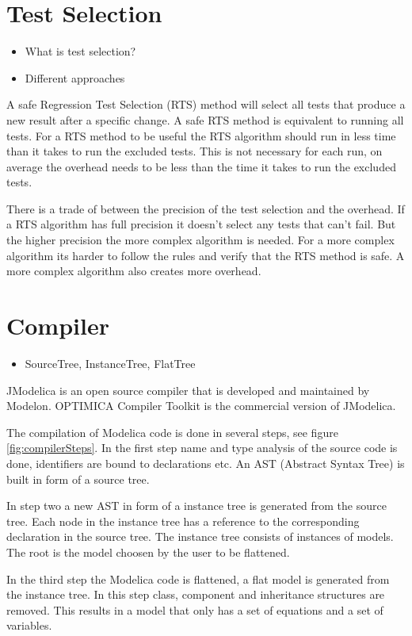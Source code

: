 \documentclass{cslthse-msc}
\begin{document}
\section{Test Selection}
\begin{itemize}
	\item What is test selection?
	\item Different approaches
\end{itemize}
A safe Regression Test Selection (RTS) method will select all tests that produce a new result after a specific change. A safe RTS method is equivalent to running all tests. For a RTS method to be useful the RTS algorithm should run in less time than it takes to run the excluded tests. This is not necessary for each run, on average the overhead needs to be less than the time it takes to run the excluded tests.

There is a trade of between the precision of the test selection and the overhead. If a RTS algorithm has full precision it doesn't select any tests that can't fail. But the higher precision the more complex algorithm is needed. For a more complex algorithm its harder to follow the rules and verify that the RTS method is safe. A more complex algorithm also creates more overhead.

\section{Compiler}
\begin{itemize}
	\item SourceTree, InstanceTree, FlatTree \cite{aakesson2010implementation}
\end{itemize}
JModelica is an open source compiler that is developed and maintained by Modelon. OPTIMICA Compiler Toolkit is the commercial version of JModelica.

The compilation of Modelica code is done in several steps, see figure \ref{fig:compilerSteps}. In the first step name and type analysis of the source code is done, identifiers are bound to declarations etc. An AST (Abstract Syntax Tree) is built in form of a source tree.

In step two a new AST in form of a instance tree is generated from the source tree. Each node in the instance tree has a reference to the corresponding declaration in the source tree. The instance tree consists of instances of models. The root is the model choosen by the user to be flattened.

In the third step the Modelica code is flattened, a flat model is generated from the instance tree. In this step class, component and inheritance structures are removed. This results in a model that only has a set of equations and a set of variables.
\end{document}
